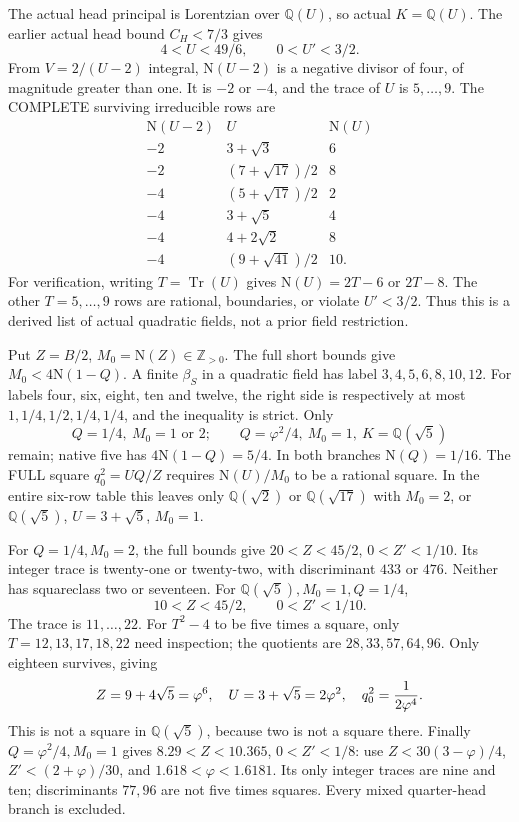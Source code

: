 \documentclass[11pt]{article}
\begin{document}
The actual head principal is Lorentzian over \(\mathbb Q(U)\),
so actual \(K=\mathbb Q(U)\).
The earlier actual head bound \(C_H<7/3\) gives
\[
                   4<U<49/6,\qquad 0<U'<3/2 .
\]
From \(V=2/(U-2)\) integral,
\(\mathrm N(U-2)\) is a negative divisor of four,
of magnitude greater than one.
It is \(-2\) or \(-4\), and the trace of \(U\) is
\(5,\ldots,9\).
The COMPLETE surviving irreducible rows are
\[
\begin{array}{c|c|c}
 \mathrm N(U-2)&U&\mathrm N(U)\\ \hline
 -2&3+\sqrt3&6\\
 -2&(7+\sqrt{17})/2&8\\
 -4&(5+\sqrt{17})/2&2\\
 -4&3+\sqrt5&4\\
 -4&4+2\sqrt2&8\\
 -4&(9+\sqrt{41})/2&10 .
\end{array}
\]
For verification, writing \(T=\operatorname{Tr}(U)\)
gives \(\mathrm N(U)=2T-6\) or \(2T-8\).
The other \(T=5,\ldots,9\) rows are rational,
boundaries, or violate \(U'<3/2\).
Thus this is a derived list of actual quadratic
fields, not a prior field restriction.

Put \(Z=B/2\), \(M_0=\mathrm N(Z)\in\mathbb Z_{>0}\).
The full short bounds give \(M_0<4\mathrm N(1-Q)\).
A finite \(\beta_S\) in a quadratic field has
label \(3,4,5,6,8,10,12\).
For labels four, six, eight, ten and twelve, the
right side is respectively at most
\(1,1/4,1/2,1/4,1/4\), and the inequality is strict.
Only
\[
 Q=1/4,\ M_0=1\text{ or }2;\qquad
 Q=\varphi^2/4,\ M_0=1,\ K=\mathbb Q(\sqrt5)
\]
remain; native five has \(4\mathrm N(1-Q)=5/4\).
In both branches \(\mathrm N(Q)=1/16\).
The FULL square \(q_0^2=UQ/Z\) requires
\(\mathrm N(U)/M_0\) to be a rational square.
In the entire six-row table this leaves only
\(\mathbb Q(\sqrt2)\) or \(\mathbb Q(\sqrt{17})\)
with \(M_0=2\), or
\(\mathbb Q(\sqrt5)\), \(U=3+\sqrt5\), \(M_0=1\).

For \(Q=1/4,M_0=2\), the full bounds give
\(20<Z<45/2\), \(0<Z'<1/10\).
Its integer trace is twenty-one or twenty-two,
with discriminant \(433\) or \(476\).
Neither has squareclass two or seventeen.
For \(\mathbb Q(\sqrt5),M_0=1,Q=1/4\),
\[
                   10<Z<45/2,\qquad 0<Z'<1/10.
\]
The trace is \(11,\ldots,22\).
For \(T^2-4\) to be five times a square, only
\(T=12,13,17,18,22\) need inspection;
the quotients are \(28,33,57,64,96\).
Only eighteen survives, giving
\[
 Z=9+4\sqrt5=\varphi^6,\quad
 U=3+\sqrt5=2\varphi^2,\quad
 q_0^2={1\over2\varphi^4}.
\]
This is not a square in \(\mathbb Q(\sqrt5)\),
because two is not a square there.
Finally \(Q=\varphi^2/4,M_0=1\) gives
\(8.29<Z<10.365\), \(0<Z'<1/8\):
use \(Z<30(3-\varphi)/4\),
\(Z'<(2+\varphi)/30\), and
\(1.618<\varphi<1.6181\).
Its only integer traces are nine and ten;
discriminants \(77,96\) are not five times squares.
Every mixed quarter-head branch is excluded.
\end{document}
